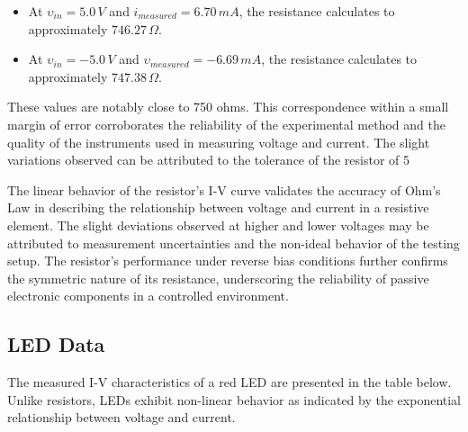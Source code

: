 \documentclass[12pt]{article}
\begin{document}
\begin{itemize}
	\item At \( \upsilon_{in} = 5.0 \, V \) and \( i_{measured} = 6.70 \, mA \), the resistance calculates to approximately \( 746.27 \, \Omega \).
	\item At \( \upsilon_{in} = -5.0 \, V \) and \( \upsilon_{measured} = -6.69 \, mA \), the resistance calculates to approximately \( 747.38 \, \Omega \).
\end{itemize}

These values are notably close to 750 ohms. This correspondence within a
small margin of error corroborates the reliability of the experimental method
and the quality of the instruments used in measuring voltage and current. The
slight variations observed can be attributed to the tolerance of the resistor of
5%

The linear behavior of the resistor's I-V curve validates the accuracy of
Ohm's Law in describing the relationship between voltage and current in a
resistive element. The slight deviations observed at higher and lower voltages
may be attributed to measurement uncertainties and the non-ideal behavior of the
testing setup. The resistor's performance under reverse bias conditions further
confirms the symmetric nature of its resistance, underscoring the reliability of
passive electronic components in a controlled environment.

\subsection{LED Data}
The measured I-V characteristics of a red LED are presented in the table below. Unlike resistors, LEDs exhibit non-linear behavior as indicated by the exponential relationship between voltage and current.
\end{document}
